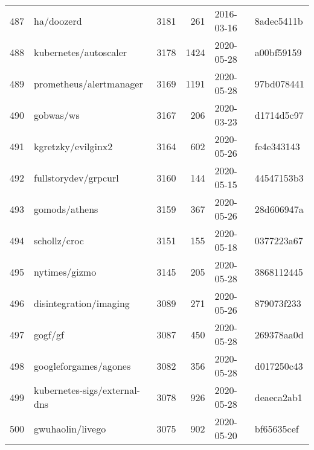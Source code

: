 \begin{footnotesize}
\begin{longtable}{llrrll}
        487 &                                         ha/doozerd &   3181 &    261 & 2016-03-16 &  8adec5411b \\
        488 &                              kubernetes/autoscaler &   3178 &   1424 & 2020-05-28 &  a00bf59159 \\
        489 &                            prometheus/alertmanager &   3169 &   1191 & 2020-05-28 &  97bd078441 \\
        490 &                                          gobwas/ws &   3167 &    206 & 2020-03-23 &  d1714d5c97 \\
        491 &                                 kgretzky/evilginx2 &   3164 &    602 & 2020-05-26 &  fe4e343143 \\
        492 &                               fullstorydev/grpcurl &   3160 &    144 & 2020-05-15 &  44547153b3 \\
        493 &                                      gomods/athens &   3159 &    367 & 2020-05-26 &  28d606947a \\
        494 &                                       schollz/croc &   3151 &    155 & 2020-05-18 &  0377223a67 \\
        495 &                                      nytimes/gizmo &   3145 &    205 & 2020-05-28 &  3868112445 \\
        496 &                             disintegration/imaging &   3089 &    271 & 2020-05-26 &  879073f233 \\
        497 &                                            gogf/gf &   3087 &    450 & 2020-05-28 &  269378aa0d \\
        498 &                              googleforgames/agones &   3082 &    356 & 2020-05-28 &  d017250c43 \\
        499 &                       kubernetes-sigs/external-dns &   3078 &    926 & 2020-05-28 &  deaeca2ab1 \\
        500 &                                   gwuhaolin/livego &   3075 &    902 & 2020-05-20 &  bf65635cef \\
    \end{longtable}
\end{footnotesize}
